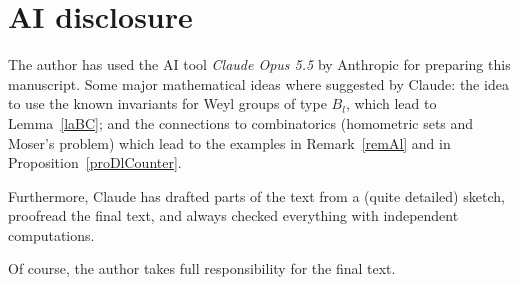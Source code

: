 \documentclass[11pt,a4paper]{article}
\theoremstyle{plain}
\theoremstyle{definition}
\begin{document}
%

\section{AI disclosure}

The author has used the AI tool \emph{Claude Opus 5.5} by Anthropic
for preparing this manuscript.
Some major mathematical ideas where suggested by Claude: the idea to use
the known invariants for Weyl groups of type $B_l$, which lead to 
Lemma~\ref{laBC}; and the connections to combinatorics (homometric sets 
and Moser's problem) which lead to the examples in Remark~\ref{remAl} and
in Proposition~\ref{proDlCounter}.


Furthermore, Claude has drafted parts of the text from a (quite detailed) sketch, 
proofread  the final text, and always checked everything with independent computations.

Of course, the author takes full responsibility for the final text.
\end{document}

